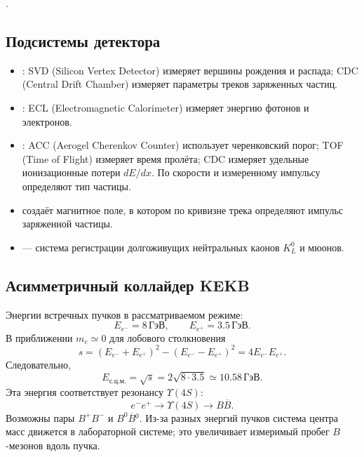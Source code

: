\documentclass[../final.tex]{subfiles}
\begin{document}
\answer
{}.

\clearpage
{}

\subsection*{Подсистемы детектора}

\begin{itemize}
    \item {}: SVD (Silicon Vertex Detector)
    измеряет вершины рождения и распада; CDC (Central Drift Chamber)
    измеряет параметры треков заряженных частиц.
    \item {}: ECL (Electromagnetic Calorimeter)
    измеряет энергию фотонов и электронов.
    \item {}: ACC (Aerogel Cherenkov Counter)
    использует черенковский порог; TOF (Time of Flight) измеряет время пролёта;
    CDC измеряет удельные ионизационные потери $dE/dx$.
    По скорости и измеренному импульсу определяют тип частицы.
    \item {} создаёт магнитное поле, в котором по кривизне
    трека определяют импульс заряженной частицы.
    \item {} --- система регистрации долгоживущих нейтральных
    каонов $K_L^0$ и мюонов.
\end{itemize}

\subsection*{Асимметричный коллайдер KEKB}

Энергии встречных пучков в рассматриваемом режиме:
\begin{equation*}
    E_{e^-}=8\,\text{ГэВ},\qquad E_{e^+}=3.5\,\text{ГэВ}.
\end{equation*}
В приближении $m_e\simeq0$ для лобового столкновения
\begin{equation*}
    s=(E_{e^-}+E_{e^+})^2-(E_{e^-}-E_{e^+})^2
    =4E_{e^-}E_{e^+}.
\end{equation*}
Следовательно,
\begin{equation*}
    E_{\text{с.ц.м.}}=\sqrt{s}
    =2\sqrt{8\cdot3.5}\simeq10.58\,\text{ГэВ}.
\end{equation*}
Эта энергия соответствует резонансу $\Upsilon(4S)$:
\begin{equation*}
    e^-e^+\longrightarrow\Upsilon(4S)\longrightarrow B\overline B.
\end{equation*}
Возможны пары $B^+B^-$ и $B^0\overline B{}^0$.
Из-за разных энергий пучков система центра масс движется в лабораторной
системе; это увеличивает измеримый пробег $B$-мезонов вдоль пучка.
\end{document}
